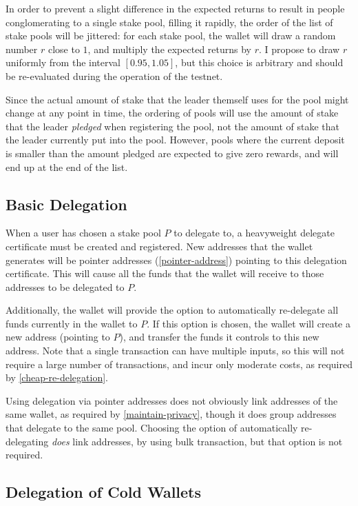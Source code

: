 \documentclass[11pt,a4paper]{article}
\begin{document}
In order to prevent a slight difference in the expected returns to
result in people conglomerating to a single stake pool, filling it
rapidly, the order of the list of stake pools will be jittered: for each
stake pool, the wallet will draw a random number \(r\) close to \(1\),
and multiply the expected returns by \(r\). I propose to draw \(r\)
uniformly from the interval \([0.95, 1.05]\), but this choice is
arbitrary and should be re-evaluated during the operation of the
testnet.

Since the actual amount of stake that the leader themself uses for the
pool might change at any point in time, the ordering of pools will use
the amount of stake that the leader \emph{pledged} when registering the
pool, not the amount of stake that the leader currently put into the
pool. However, pools where the current deposit is smaller than the
amount pledged are expected to give zero rewards, and will end up at the
end of the list.

\subsection{Basic Delegation}
\label{basic-delegation}

When a user has chosen a stake pool \(P\) to delegate to, a heavyweight
delegate certificate must be created and registered. New addresses that
the wallet generates will be pointer addresses (\cref{pointer-address})
pointing to this delegation certificate. This will cause all the funds
that the wallet will receive to those addresses to be delegated to
\(P\).

Additionally, the wallet will provide the option to automatically
re-delegate all funds currently in the wallet to \(P\). If this option
is chosen, the wallet will create a new address (pointing to \(P\)), and
transfer the funds it controls to this new address. Note that a single
transaction can have multiple inputs, so this will not require a large
number of transactions, and incur only moderate costs, as required by
\cref{cheap-re-delegation}.

Using delegation via pointer addresses does not obviously link addresses
of the same wallet, as required by \cref{maintain-privacy}, though it
does group addresses that delegate to the same pool. Choosing the option
of automatically re-delegating \emph{does} link addresses, by using bulk
transaction, but that option is not required.

\subsection{Delegation of Cold Wallets}
\label{delegation-of-cold-wallets}
\end{document}
